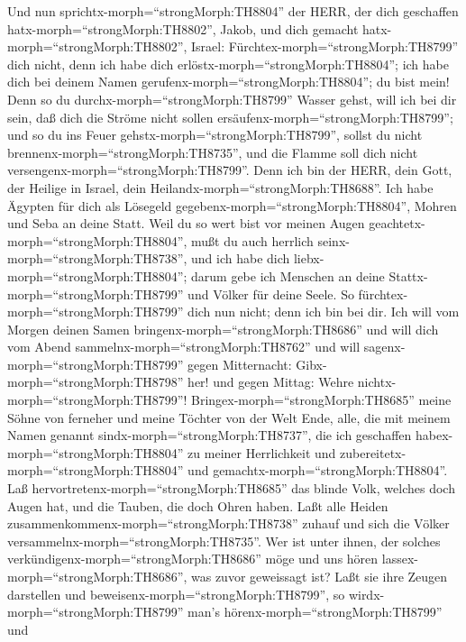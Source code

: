  Und nun sprichtx-morph=``strongMorph:TH8804'' der HERR, der
dich geschaffen hatx-morph=``strongMorph:TH8802'', Jakob, und dich
gemacht hatx-morph=``strongMorph:TH8802'', Israel:
Fürchtex-morph=``strongMorph:TH8799'' dich nicht, denn ich habe dich
erlöstx-morph=``strongMorph:TH8804''; ich habe dich bei deinem Namen
gerufenx-morph=``strongMorph:TH8804''; du bist mein!  Denn
so du durchx-morph=``strongMorph:TH8799'' Wasser gehst, will ich bei dir
sein, daß dich die Ströme nicht sollen
ersäufenx-morph=``strongMorph:TH8799''; und so du ins Feuer
gehstx-morph=``strongMorph:TH8799'', sollst du nicht
brennenx-morph=``strongMorph:TH8735'', und die Flamme soll dich nicht
versengenx-morph=``strongMorph:TH8799''.  Denn ich bin der
HERR, dein Gott, der Heilige in Israel, dein
Heilandx-morph=``strongMorph:TH8688''. Ich habe Ägypten für dich als
Lösegeld gegebenx-morph=``strongMorph:TH8804'', Mohren und Seba an deine
Statt.  Weil du so wert bist vor meinen Augen
geachtetx-morph=``strongMorph:TH8804'', mußt du auch herrlich
seinx-morph=``strongMorph:TH8738'', und ich habe dich
liebx-morph=``strongMorph:TH8804''; darum gebe ich Menschen an deine
Stattx-morph=``strongMorph:TH8799'' und Völker für deine Seele.
 So fürchtex-morph=``strongMorph:TH8799'' dich nun nicht;
denn ich bin bei dir. Ich will vom Morgen deinen Samen
bringenx-morph=``strongMorph:TH8686'' und will dich vom Abend
sammelnx-morph=``strongMorph:TH8762''  und will
sagenx-morph=``strongMorph:TH8799'' gegen Mitternacht:
Gibx-morph=``strongMorph:TH8798'' her! und gegen Mittag: Wehre
nichtx-morph=``strongMorph:TH8799''!
Bringex-morph=``strongMorph:TH8685'' meine Söhne von ferneher und meine
Töchter von der Welt Ende,  alle, die mit meinem Namen
genannt sindx-morph=``strongMorph:TH8737'', die ich geschaffen
habex-morph=``strongMorph:TH8804'' zu meiner Herrlichkeit und
zubereitetx-morph=``strongMorph:TH8804'' und
gemachtx-morph=``strongMorph:TH8804''.  Laß
hervortretenx-morph=``strongMorph:TH8685'' das blinde Volk, welches doch
Augen hat, und die Tauben, die doch Ohren haben.  Laßt alle
Heiden zusammenkommenx-morph=``strongMorph:TH8738'' zuhauf und sich die
Völker versammelnx-morph=``strongMorph:TH8735''. Wer ist unter ihnen,
der solches verkündigenx-morph=``strongMorph:TH8686'' möge und uns hören
lassex-morph=``strongMorph:TH8686'', was zuvor geweissagt ist? Laßt sie
ihre Zeugen darstellen und beweisenx-morph=``strongMorph:TH8799'', so
wirdx-morph=``strongMorph:TH8799'' man's
hörenx-morph=``strongMorph:TH8799'' und
